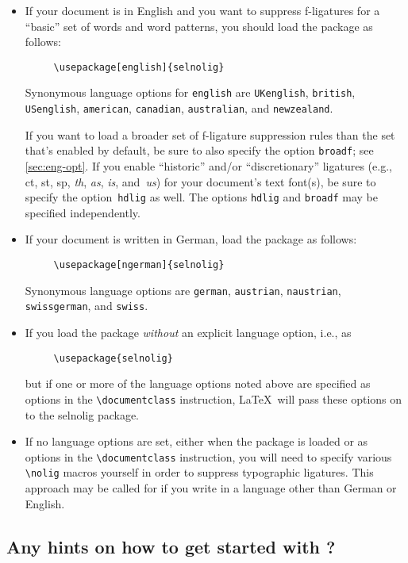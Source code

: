 \documentclass[11pt]{article}
\newcommand{\pkg}[1]{\textsf{#1}}
\newcommand{\opt}[1]{\texttt{#1}}
\newcommand{\cmmd}[1]{\texttt{\textbackslash #1}}
\begin{document}
\begin{itemize}
\item If your document is in English and you want to suppress f-ligatures for a \enquote{basic} set of words and word patterns, you should load the package as follows:
\begin{Verbatim}
     \usepackage[english]{selnolig}
\end{Verbatim}
Synonymous language options for \opt{english} are \opt{UKenglish}, \opt{british}, \opt{USenglish}, \opt{american}, \opt{cana\-dian}, \opt{australian}, and \opt{new\-zealand}.


If you want to load a broader set of f-ligature suppression rules than the set that's enabled by default, be sure to also specify the option \opt{broadf}; see \cref{sec:eng-opt}.
If you enable \enquote{historic} and/or \enquote{discretionary} ligatures (e.g., ct, st, sp, \emph{th}, \emph{as}, \emph{is}, and~\emph{us}) for your document's text font(s), be sure to specify the option~\opt{hdlig} as well. The options \opt{hdlig} and \opt{broadf} may be specified independently.

\item If your document is written in German, load the package as follows:
\begin{Verbatim}
     \usepackage[ngerman]{selnolig}
\end{Verbatim}
Synonymous language options are \opt{german}, \opt{austrian}, \opt{naustrian}, \opt{swissgerman}, and \opt{swiss}.

\item If you load the package \emph{without} an explicit language option, i.e., as
\begin{Verbatim}
     \usepackage{selnolig}
\end{Verbatim}
but if one or more of the language options noted above are specified as options in the \cmmd{documentclass} instruction, \LaTeX\ will pass these options on to the \pkg{selnolig} package.

\item If no language options are set, either when the package is loaded or as options in the \cmmd{documentclass} instruction, you will need to specify various \cmmd{nolig} macros yourself in order to suppress typographic ligatures. This approach may be called for if you write in a language other than German or English.

\end{itemize}


\subsection{Any hints on how to get started with \LuaLaTeX?}
\end{document}
